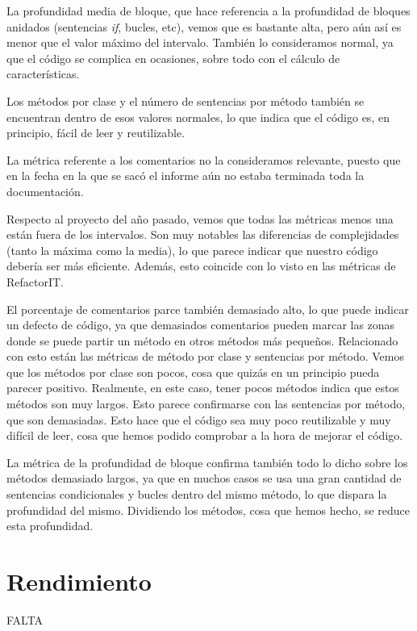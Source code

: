 La profundidad media de bloque, que hace referencia a la profundidad de bloques anidados (sentencias \textit{if}, bucles, etc), vemos que es bastante alta, pero aún así es menor que el valor máximo del intervalo. También lo consideramos normal, ya que el código se complica en ocasiones, sobre todo con el cálculo de características.

Los métodos por clase y el número de sentencias por método también se encuentran dentro de esos valores normales, lo que indica que el código es, en principio, fácil de leer y reutilizable.

La métrica referente a los comentarios no la consideramos relevante, puesto que en la fecha en la que se sacó el informe aún no estaba terminada toda la documentación.

Respecto al proyecto del año pasado, vemos que todas las métricas menos una están fuera de los intervalos. Son muy notables las diferencias de complejidades (tanto la máxima como la media), lo que parece indicar que nuestro código debería ser más eficiente. Además, esto coincide con lo visto en las métricas de RefactorIT.

El porcentaje de comentarios parce también demasiado alto, lo que puede indicar un defecto de código, ya que demasiados comentarios pueden marcar las zonas donde se puede partir un método en otros métodos más pequeños. Relacionado con esto están las métricas de método por clase y sentencias por método. Vemos que los métodos por clase son pocos, cosa que quizás en un principio pueda parecer positivo. Realmente, en este caso, tener pocos métodos indica que estos métodos son muy largos. Esto parece confirmarse con las sentencias por método, que son demasiadas. Esto hace que el código sea muy poco reutilizable y muy difícil de leer, cosa que hemos podido comprobar a la hora de mejorar el código.

La métrica de la profundidad de bloque confirma también todo lo dicho sobre los métodos demasiado largos, ya que en muchos casos se usa una gran cantidad de sentencias condicionales y bucles dentro del mismo método, lo que dispara la profundidad del mismo. Dividiendo los métodos, cosa que hemos hecho, se reduce esta profundidad.


\section{Rendimiento}\label{rendimiento}
FALTA